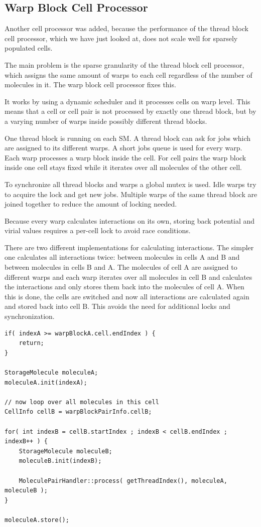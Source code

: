 \subsection{Warp Block Cell Processor}
Another cell processor was added, because the performance of the thread block cell processor, which we have just looked at, does not scale well for sparsely populated cells. 

The main problem is the sparse granularity of the thread block cell processor, which assigns the same amount of warps to each cell regardless of the number of molecules in it. The warp block cell processor fixes this.

It works by using a dynamic scheduler and it processes cells on warp level. This means that a cell or cell pair is not processed by exactly one thread block, but by a varying number of warps inside possibly different thread blocks.

One thread block is running on each SM. A thread block can ask for jobs which are assigned to its different warps. A short jobs queue is used for every warp. Each warp processes a warp block inside the cell. For cell pairs the warp block inside one cell stays fixed while it iterates over all molecules of the other cell.

To synchronize all thread blocks and warps a global mutex is used. Idle warps try to acquire the lock and get new jobs. Multiple warps of the same thread block are joined together to reduce the amount of locking needed.

Because every warp calculates interactions on its own, storing back potential and virial values requires a per-cell lock to avoid race conditions.

There are two different implementations for calculating interactions. The simpler one calculates all  interactions twice: between molecules in cells A and B and between molecules in cells B and A.
The molecules of cell A are assigned to different warps and each warp iterates over all molecules in cell B and calculates the interactions and only stores them back into the molecules of cell A.
When this is done, the cells are switched and now all interactions are calculated again and stored back into cell B.
This avoids the need for additional locks and synchronization.

\begin{lstlisting}[caption=inter-cell block processing (warp block cell processor)]
if( indexA >= warpBlockA.cell.endIndex ) {
	return;
}

StorageMolecule moleculeA;
moleculeA.init(indexA);

// now loop over all molecules in this cell
CellInfo cellB = warpBlockPairInfo.cellB;

for( int indexB = cellB.startIndex ; indexB < cellB.endIndex ; indexB++ ) {
	StorageMolecule moleculeB;
	moleculeB.init(indexB);

	MoleculePairHandler::process( getThreadIndex(), moleculeA, moleculeB );
}

moleculeA.store();
\end{lstlisting}

